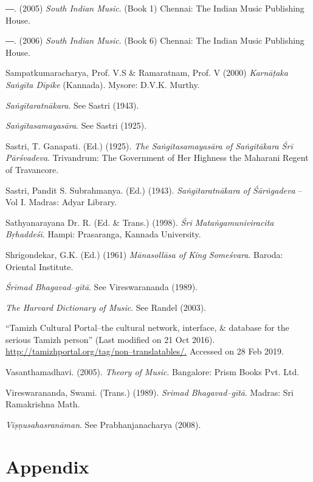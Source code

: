 \begin{thebibliography}{99}
  ―. (2005) \textit{South Indian Music}. (Book 1) Chennai: The Indian Music Publishing House.

  ―. (2006) \textit{South Indian Music}. (Book 6) Chennai: The Indian Music Publishing House.

  Sampatkumaracharya, Prof. V.S \& Ramaratnam, Prof. V (2000) \textit{Karnāṭaka Saṅgīta Dīpike} (Kannada). Mysore: D.V.K. Murthy.

  \textit{Saṅgītaratnākara}. See Sastri (1943).

  \textit{Saṅgītasamayasāra}. See Sastri (1925).

  Sastri, T. Ganapati. (Ed.) (1925). \textit{The Saṅgītasamayasāra of Saṅgitākara Śrī Pārśvadeva}. Trivandrum: The Government of Her Highness the Maharani Regent of Travancore. 

  Sastri, Pandit S. Subrahmanya. (Ed.) (1943). \textit{Saṅgītaratnākara of Śārṅgadeva} – Vol I. Madras: Adyar Library.

  Sathyanarayana Dr. R. (Ed. \& Trans.) (1998). \textit{Śri Mataṅgamuniviracita Bṛhaddeśī}. Hampi: Prasaranga, Kannada University.

  Shrigondekar, G.K. (Ed.) (1961) \textit{Mānasollāsa of King Someśvara}. Baroda: Oriental Institute.

  \textit{Śrīmad Bhagavad–gītā}. See Vireswarananda (1989).

  \textit{The Harvard Dictionary of Music}. See Randel (2003).

  “Tamizh Cultural Portal–the cultural network, interface, \& database for the serious Tamizh person” (Last modified on 21 Oct 2016). \url{http://tamizhportal.org/tag/non–translatables/.} Accessed on 28 Feb 2019.

  Vasanthamadhavi. (2005). \textit{Theory of Music}. Bangalore: Prism Books Pvt. Ltd.

  Vireswarananda, Swami. (Trans.) (1989). \textit{Srimad Bhagavad–gītā}. Madras: Sri Ramakrishna Math.

  \textit{Viṣṇusahasranāman}. See Prabhanjanacharya (2008).

 \end{thebibliography}


\section*{Appendix}

